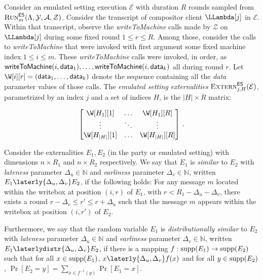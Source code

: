 \begin{definition}
  Consider an emulated setting execution $\mathcal{E}$ with duration $R$ rounds
  sampled from $\textsc{Run}^{\textsf{ES}}_m(\Lambda,\allowbreak \mathcal{Y},\allowbreak \mathcal{A},\allowbreak \mathcal{Z})$.
  Consider the transcript of compositor client $\LLambda[j]$ in $\mathcal{E}$.
  Within that transcript, observe the \emph{writeToMachine} calls made by
  $\mathcal{Z}$ on $\LLambda[j]$ during some fixed round $1 \leq r \leq R$.
  Among those, consider the calls to \emph{writeToMachine} that were
  invoked with first argument some fixed machine index $1 \leq i \leq m$.
  These \emph{writeToMachine} calls were invoked, in order, as
  $\textsf{writeToMachine}(i, \textsf{data}_1), \ldots, \textsf{writeToMachine}(i, \textsf{data}_k)$
  all during round $r$.
  Let $\W[i][r] = (\data_1,\allowbreak\ldots,\allowbreak\data_k)$ denote the sequence containing
  all the \emph{data} parameter values of those calls.
  The \emph{emulated setting externalities} $\textsc{Extern}^{\textsf{ES}}_{j,H}(\mathcal{E})$, parametrized
  by an index $j$ and a set of indices $H$, is the $|H| \times R$ matrix:

  \[
  \begin{bmatrix}
    \W[H_1][1] &\ldots& \W[H_1][R]\\
         \vdots &\ddots& \vdots     \\
    \W[H_{|H|}][1] &\ldots& \W[H_{|H|}][R]
  \end{bmatrix}\,.
  \]
\end{definition}

\begin{definition}
  Consider the externalities $E_1, E_2$ (in the party or emulated setting)
  with dimensions $n \times R_1$ and $n \times R_2$ respectively.
  We say that $E_1$ is \emph{similar} to $E_2$ with \emph{lateness} parameter
  $\Delta_u \in \mathbb{N}$ and \emph{earliness} parameter $\Delta_v \in \mathbb{N}$, written
  $E_1 \laterly{\Delta_u,\Delta_v} E_2$, if
  the following holds:
  For any message $m$ located within the writebox at position $(i, r)$ of $E_1$,
  with $r < R_1 - \Delta_u - \Delta_v$,
  there exists a round $r - \Delta_v \leq r' \leq r + \Delta_u$ such that
  the message $m$ appears within the writebox at position $(i, r')$ of $E_2$.

  Furthermore, we say that the random variable $E_1$
  is \emph{distributionally similar} to $E_2$
  with \emph{lateness} parameter $\Delta_u \in \mathbb{N}$
  and \emph{earliness} parameter $\Delta_v \in \mathbb{N}$,
  written $E_1 \laterlydistr{\Delta_u,\Delta_v} E_2$, if
  there is a mapping $f: \operatorname{supp}(E_1) \rightarrow \operatorname{supp}(E_2)$
  such that for all $x \in \operatorname{supp}(E_1)$, $x \laterly{\Delta_u,\Delta_v} f(x)$ and
  for all $y \in \operatorname{supp}(E_2)$, $\Pr[E_2 = y] = \sum_{x \in f^{-1}(y)} \Pr[E_1 = x]$.
\end{definition}


